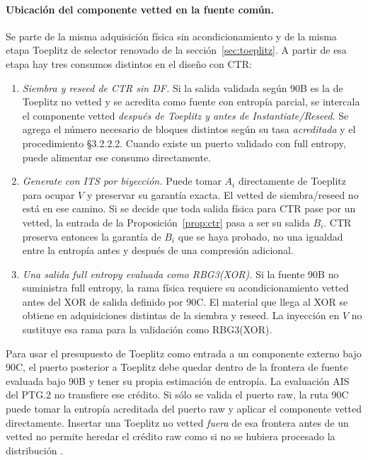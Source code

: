 \documentclass[11pt,a4paper]{article}
\begin{document}
\paragraph{Ubicación del componente vetted en la fuente común.}
Se parte de la misma adquisición física sin acondicionamiento
y de la misma etapa Toeplitz de selector renovado de la
sección~\ref{sec:toeplitz}. A partir de esa etapa hay tres
consumos distintos en el diseño con CTR:
\begin{enumerate}
 \item \emph{Siembra y reseed de CTR sin DF.}
 Si la salida validada según 90B es la de Toeplitz no vetted
 y se acredita como fuente con entropía parcial, se intercala
 el componente vetted \emph{después de Toeplitz y antes de
 Instantiate/Reseed}. Se agrega el número necesario de
 bloques distintos según su tasa \emph{acreditada} y
 el procedimiento §3.2.2.2. Cuando existe un puerto validado
 con full entropy, puede alimentar ese consumo directamente.
 \item \emph{Generate con ITS por biyección.}
 Puede tomar \(A_i\) directamente de Toeplitz para ocupar
 \(V\) y preservar su garantía exacta. El vetted de
 siembra/reseed no está en ese camino. Si se decide que toda
 salida física para CTR pase por un vetted, la entrada de
 la Proposición~\ref{prop:ctr} pasa a ser su salida \(B_i\).
 CTR preserva entonces la garantía de \(B_i\) que se haya
 probado, no una igualdad entre la entropía antes y después
 de una compresión adicional.
 \item \emph{Una salida full entropy evaluada como RBG3(XOR).}
 Si la fuente 90B no suministra full entropy, la rama
 física requiere su acondicionamiento vetted antes del
 XOR de salida definido por 90C. El material que llega al
 XOR se obtiene en adquisiciones distintas de la siembra
 y reseed. La inyección en \(V\) no sustituye esa rama
 para la validación como RBG3(XOR).
\end{enumerate}
Para usar el presupuesto de Toeplitz como entrada a un
componente externo bajo 90C, el puerto posterior a Toeplitz
debe quedar dentro de la frontera de fuente evaluada bajo
90B y tener su propia estimación de entropía. La evaluación
AIS del PTG.2 no transfiere ese crédito. Si sólo se valida
el puerto raw, la ruta 90C puede tomar la entropía acreditada
del puerto raw y aplicar el componente vetted directamente.
Insertar una Toeplitz no vetted \emph{fuera} de esa frontera
antes de un vetted no permite heredar el crédito raw como si
no se hubiera procesado la distribución
\cite[§3.1.5]{nist90b}\cite[§§3.1--3.2, 5.3, 6.3--6.5]{nist90c}.
\end{document}
